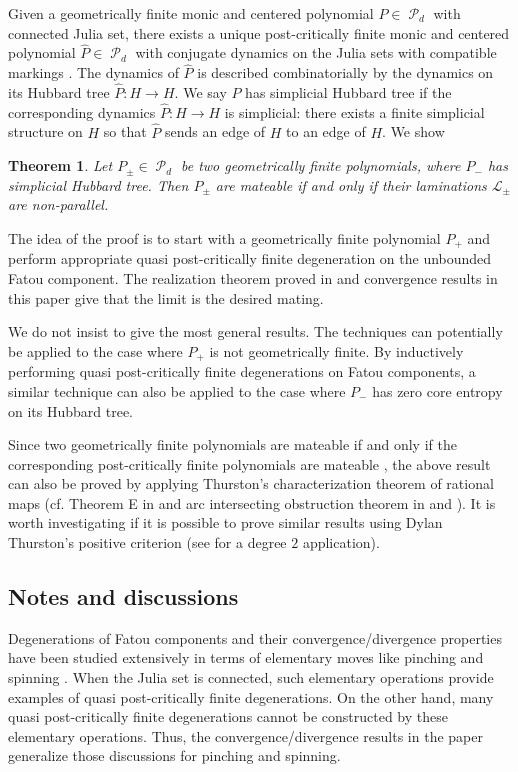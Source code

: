 \documentclass[11pt, reqno]{amsart}
\numberwithin{equation}{section}
\theoremstyle{plain}
\newtheorem{theorem}{Theorem}[section]
\theoremstyle{theorem}
\theoremstyle{definition}
\DeclareMathOperator{\MP}{\mathcal{P}}
\numberwithin{figure}{section}
\begin{document}
Given a geometrically finite monic and centered polynomial $P \in \MP_d$ with connected Julia set, there exists a unique post-critically finite monic and centered polynomial $\hat P \in \MP_d$ with conjugate dynamics on the Julia sets with compatible markings \cite{Haissinsky00}.
The dynamics of $\hat P$ is described combinatorially by the dynamics on its Hubbard tree $\hat P: H \rightarrow H$.
We say $P$ has simplicial Hubbard tree if the corresponding dynamics $\hat P: H \rightarrow H$ is simplicial: there exists a finite simplicial structure on $H$ so that $\hat P$ sends an edge of $H$ to an edge of $H$. We show
{
\renewcommand{\thetheorem}{\ref{thm:mating}}
\begin{theorem}
Let $P_\pm \in \MP_d$ be two geometrically finite polynomials, where $P_-$ has simplicial Hubbard tree.
Then $P_\pm$ are mateable if and only if their laminations $\mathcal{L}_\pm$ are non-parallel.
\end{theorem}
\addtocounter{theorem}{-1}
}

The idea of the proof is to start with a geometrically finite polynomial $P_+$ and perform appropriate quasi post-critically finite degeneration on the unbounded Fatou component.
The realization theorem proved in \cite{Luo21} and convergence results in this paper give that the limit is the desired mating.

We do not insist to give the most general results.
The techniques can potentially be applied to the case where $P_+$ is not geometrically finite.
By inductively performing quasi post-critically finite degenerations on Fatou components, a similar technique can also be applied to the case where $P_-$ has zero core entropy on its Hubbard tree.

Since two geometrically finite polynomials are mateable if and only if the corresponding post-critically finite polynomials are mateable \cite{HT04}, the above result can also be proved by applying Thurston's characterization theorem of rational maps (cf. Theorem E in \cite{BD18} and arc intersecting obstruction theorem in \cite{PT98} and \cite{Park21}).
It is worth investigating if it is possible to prove similar results using Dylan Thurston's positive criterion \cite{Thurston20} (see \cite{DPWY20} for a degree $2$ application).



\subsection*{Notes and discussions}
Degenerations of Fatou components and their convergence/divergence properties have been studied extensively in terms of elementary moves like pinching and spinning \cite{Makienko00, TanLei02, HT04, PT04, CT18}.
When the Julia set is connected, such elementary operations provide examples of quasi post-critically finite degenerations.
On the other hand, many quasi post-critically finite degenerations cannot be constructed by these elementary operations.
Thus, the convergence/divergence results in the paper generalize those discussions for pinching and spinning.
\end{document}

